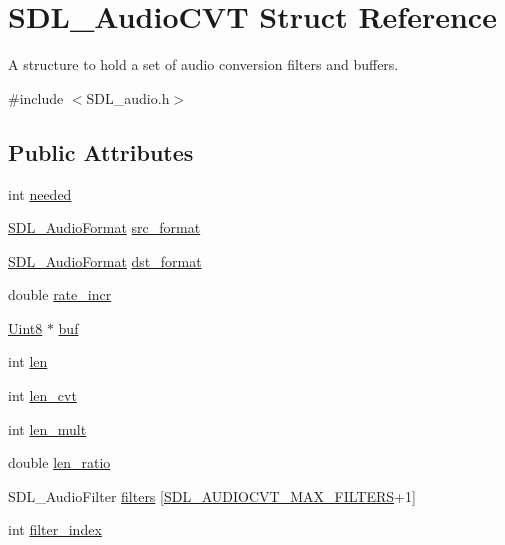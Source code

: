 \hypertarget{struct_s_d_l___audio_c_v_t}{}\section{S\+D\+L\+\_\+\+Audio\+C\+VT Struct Reference}
\label{struct_s_d_l___audio_c_v_t}


A structure to hold a set of audio conversion filters and buffers.  




{\ttfamily \#include $<$S\+D\+L\+\_\+audio.\+h$>$}

\subsection*{Public Attributes}
\begin{DoxyCompactItemize}
\item 
int \mbox{\hyperlink{struct_s_d_l___audio_c_v_t_ac600a035a48df05e14d3712fd6953ad4}{needed}}
\item 
\mbox{\hyperlink{_s_d_l__audio_8h_a491ed103fd25d920c4e6b7495217ce66}{S\+D\+L\+\_\+\+Audio\+Format}} \mbox{\hyperlink{struct_s_d_l___audio_c_v_t_a6ae81231e017105e6d5e745a51732e16}{src\+\_\+format}}
\item 
\mbox{\hyperlink{_s_d_l__audio_8h_a491ed103fd25d920c4e6b7495217ce66}{S\+D\+L\+\_\+\+Audio\+Format}} \mbox{\hyperlink{struct_s_d_l___audio_c_v_t_a8f890d017be857a3b048bf00525736c6}{dst\+\_\+format}}
\item 
double \mbox{\hyperlink{struct_s_d_l___audio_c_v_t_ad886122c23a6673073baace31bff3b6c}{rate\+\_\+incr}}
\item 
\mbox{\hyperlink{_s_d_l__stdinc_8h_a2944638813a090aa23e62f4da842c3e2}{Uint8}} $\ast$ \mbox{\hyperlink{struct_s_d_l___audio_c_v_t_a080db27b929efa983c5161360ffce310}{buf}}
\item 
int \mbox{\hyperlink{struct_s_d_l___audio_c_v_t_aeaeb8c5a63c3ab96471fbfdf412c78ff}{len}}
\item 
int \mbox{\hyperlink{struct_s_d_l___audio_c_v_t_a5c60163f34d1947e5b166c23aba9879d}{len\+\_\+cvt}}
\item 
int \mbox{\hyperlink{struct_s_d_l___audio_c_v_t_ac9662d47cf2348b82b27b151150116b0}{len\+\_\+mult}}
\item 
double \mbox{\hyperlink{struct_s_d_l___audio_c_v_t_a5628ff5ccf711de9d77c0a4a9f57d2f0}{len\+\_\+ratio}}
\item 
S\+D\+L\+\_\+\+Audio\+Filter \mbox{\hyperlink{struct_s_d_l___audio_c_v_t_afeb8dc60716644de3b681653442de1db}{filters}} \mbox{[}\mbox{\hyperlink{_s_d_l__audio_8h_a3d38380ac4a45a68a0e1c1a7a02bd290}{S\+D\+L\+\_\+\+A\+U\+D\+I\+O\+C\+V\+T\+\_\+\+M\+A\+X\+\_\+\+F\+I\+L\+T\+E\+RS}}+1\mbox{]}
\item 
int \mbox{\hyperlink{struct_s_d_l___audio_c_v_t_a35093b3ad3331c17416c593a76012b63}{filter\+\_\+index}}
\end{DoxyCompactItemize}


